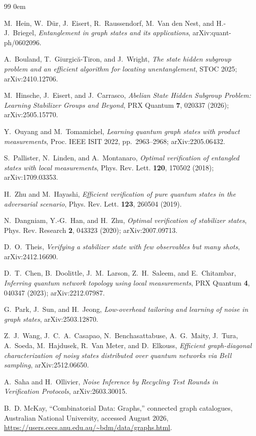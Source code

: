 \documentclass[11pt]{article}
\theoremstyle{remark}
\begin{document}
\begin{thebibliography}{99}
\small
\itemsep0em

 M.~Hein, W.~D\"ur, J.~Eisert, R.~Raussendorf, M.~Van den Nest, and H.-J.~Briegel, \emph{Entanglement in graph states and its applications}, arXiv:quant-ph/0602096.

 A.~Bouland, T.~Giurgic\u{a}-Tiron, and J.~Wright, \emph{The state hidden subgroup problem and an efficient algorithm for locating unentanglement}, STOC 2025; arXiv:2410.12706.

 M.~Hinsche, J.~Eisert, and J.~Carrasco, \emph{Abelian State Hidden Subgroup Problem: Learning Stabilizer Groups and Beyond}, PRX Quantum \textbf{7}, 020337 (2026); arXiv:2505.15770.

 Y.~Ouyang and M.~Tomamichel, \emph{Learning quantum graph states with product measurements}, Proc. IEEE ISIT 2022, pp.~2963--2968; arXiv:2205.06432.

 S.~Pallister, N.~Linden, and A.~Montanaro, \emph{Optimal verification of entangled states with local measurements}, Phys. Rev. Lett. \textbf{120}, 170502 (2018); arXiv:1709.03353.

 H.~Zhu and M.~Hayashi, \emph{Efficient verification of pure quantum states in the adversarial scenario}, Phys. Rev. Lett. \textbf{123}, 260504 (2019).

 N.~Dangniam, Y.-G.~Han, and H.~Zhu, \emph{Optimal verification of stabilizer states}, Phys. Rev. Research \textbf{2}, 043323 (2020); arXiv:2007.09713.

 D.~O.~Theis, \emph{Verifying a stabilizer state with few observables but many shots}, arXiv:2412.16690.

 D.~T.~Chen, B.~Doolittle, J.~M.~Larson, Z.~H.~Saleem, and E.~Chitambar, \emph{Inferring quantum network topology using local measurements}, PRX Quantum \textbf{4}, 040347 (2023); arXiv:2212.07987.

 G.~Park, J.~Sun, and H.~Jeong, \emph{Low-overhead tailoring and learning of noise in graph states}, arXiv:2503.12870.

 Z.~J.~Wang, J.~C.~A.~Casapao, N.~Benchasattabuse, A.~G.~Maity, J.~Tura, A.~Soeda, M.~Hajdusek, R.~Van Meter, and D.~Elkouss, \emph{Efficient graph-diagonal characterization of noisy states distributed over quantum networks via Bell sampling}, arXiv:2512.06650.

 A.~Saha and H.~Ollivier, \emph{Noise Inference by Recycling Test Rounds in Verification Protocols}, arXiv:2603.30015.

B.~D. McKay, ``Combinatorial Data: Graphs,'' connected graph catalogues, Australian National University, accessed August 2026, \url{https://users.cecs.anu.edu.au/~bdm/data/graphs.html}.

\end{thebibliography}
\end{document}
